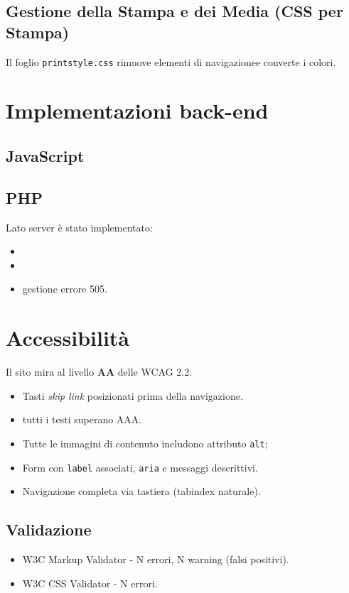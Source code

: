 \documentclass{article}
\begin{document}
\subsection{Gestione della Stampa e dei Media (CSS per Stampa)}
Il foglio \texttt{printstyle.css} rimuove elementi di navigazionee converte i colori.

\newpage


\section{Implementazioni back-end}



\subsection{JavaScript}


\subsection{PHP}

Lato server è stato implementato:

\begin{itemize}
    \item
    \item 
    \item gestione errore 505.
\end{itemize}


\section{Accessibilità}
Il sito mira al livello \textbf{AA} delle WCAG 2.2.

\begin{itemize}
    \item Tasti \emph{skip link} posizionati prima della navigazione.
    \item tutti i testi superano AAA.
    \item Tutte le immagini di contenuto includono attributo \texttt{alt};
    \item Form con \texttt{label} associati, \texttt{aria} e messaggi descrittivi.
    \item Navigazione completa via tastiera (tabindex naturale).
\end{itemize}


\subsection{Validazione}
\begin{itemize}
    \item W3C Markup Validator - N errori, N warning (falsi positivi).
    \item W3C CSS Validator - N errori.
\end{itemize}
\end{document}
